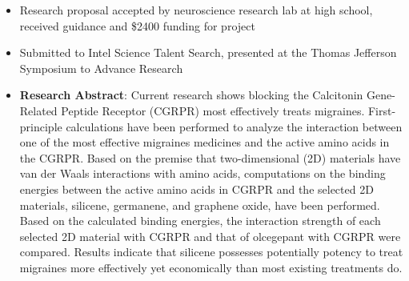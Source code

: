 \documentclass[letterpaper,11pt]{article}
\makeatletter
\newcommand{\resitem}[1]{\item #1 \vspace{-2pt}}
\newcommand{\ressubheading}[4]{
\begin{tabular*}{7.0in}{l@{\extracolsep{\fill}}r}
		\textbf{#1} & #2 \\
		\textit{#3} & \textit{#4} \\
\end{tabular*}\vspace{-6pt}}
\makeatother
\begin{document}
\begin{itemize}
\begin{itemize}
	    \resitem{Research proposal accepted by neuroscience research lab at high school, received guidance and \$2400 funding for project}
	    \resitem{Submitted to Intel Science Talent Search, presented at the Thomas Jefferson Symposium to Advance Research}
		\resitem{\textbf{Research Abstract}: \footnotesize{Current research shows blocking the Calcitonin Gene-Related Peptide Receptor (CGRPR) most effectively treats migraines. First-principle calculations have been performed to analyze the interaction between one of the most effective migraines medicines and the active amino acids in the CGRPR. Based on the premise that two-dimensional (2D) materials have van der Waals interactions with amino acids, computations on the binding energies between the active amino acids in CGRPR and the selected 2D materials, silicene, germanene, and graphene oxide, have been performed. Based on the calculated binding energies, the interaction strength of each selected 2D material with CGRPR and that of olcegepant with CGRPR were compared. Results indicate that silicene possesses potentially potency to treat migraines more effectively yet economically than most existing treatments do.}}
	\end{itemize}

\end{itemize}
\end{document}
